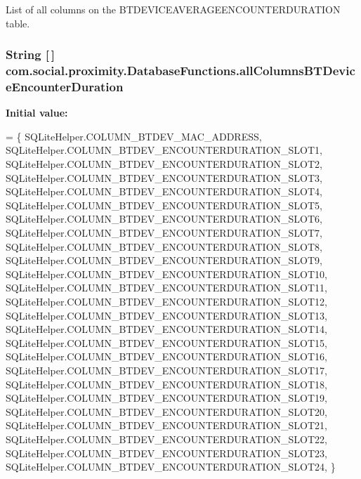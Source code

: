 List of all columns on the B\+T\+D\+E\+V\+I\+C\+E\+A\+V\+E\+R\+A\+G\+E\+E\+N\+C\+O\+U\+N\+T\+E\+R\+D\+U\+R\+A\+T\+I\+O\+N table. \hypertarget{classcom_1_1social_1_1proximity_1_1_database_functions_ab59f771fe031574737a9c5a9487d2540}{}
\subsubsection[{all\+Columns\+B\+T\+Device\+Encounter\+Duration}]{\setlength{\rightskip}{0pt plus 5cm}String \mbox{[}$\,$\mbox{]} com.\+social.\+proximity.\+Database\+Functions.\+all\+Columns\+B\+T\+Device\+Encounter\+Duration\hspace{0.3cm}{\ttfamily [private]}}\label{classcom_1_1social_1_1proximity_1_1_database_functions_ab59f771fe031574737a9c5a9487d2540}
{\bfseries Initial value\+:}
\begin{DoxyCode}
= \{ 
            SQLiteHelper.COLUMN\_BTDEV\_MAC\_ADDRESS,
            SQLiteHelper.COLUMN\_BTDEV\_ENCOUNTERDURATION\_SLOT1,
            SQLiteHelper.COLUMN\_BTDEV\_ENCOUNTERDURATION\_SLOT2,
            SQLiteHelper.COLUMN\_BTDEV\_ENCOUNTERDURATION\_SLOT3,
            SQLiteHelper.COLUMN\_BTDEV\_ENCOUNTERDURATION\_SLOT4,
            SQLiteHelper.COLUMN\_BTDEV\_ENCOUNTERDURATION\_SLOT5,
            SQLiteHelper.COLUMN\_BTDEV\_ENCOUNTERDURATION\_SLOT6,
            SQLiteHelper.COLUMN\_BTDEV\_ENCOUNTERDURATION\_SLOT7,
            SQLiteHelper.COLUMN\_BTDEV\_ENCOUNTERDURATION\_SLOT8,
            SQLiteHelper.COLUMN\_BTDEV\_ENCOUNTERDURATION\_SLOT9,
            SQLiteHelper.COLUMN\_BTDEV\_ENCOUNTERDURATION\_SLOT10,
            SQLiteHelper.COLUMN\_BTDEV\_ENCOUNTERDURATION\_SLOT11,
            SQLiteHelper.COLUMN\_BTDEV\_ENCOUNTERDURATION\_SLOT12,
            SQLiteHelper.COLUMN\_BTDEV\_ENCOUNTERDURATION\_SLOT13,
            SQLiteHelper.COLUMN\_BTDEV\_ENCOUNTERDURATION\_SLOT14,
            SQLiteHelper.COLUMN\_BTDEV\_ENCOUNTERDURATION\_SLOT15,
            SQLiteHelper.COLUMN\_BTDEV\_ENCOUNTERDURATION\_SLOT16,
            SQLiteHelper.COLUMN\_BTDEV\_ENCOUNTERDURATION\_SLOT17,
            SQLiteHelper.COLUMN\_BTDEV\_ENCOUNTERDURATION\_SLOT18,
            SQLiteHelper.COLUMN\_BTDEV\_ENCOUNTERDURATION\_SLOT19,
            SQLiteHelper.COLUMN\_BTDEV\_ENCOUNTERDURATION\_SLOT20,
            SQLiteHelper.COLUMN\_BTDEV\_ENCOUNTERDURATION\_SLOT21,
            SQLiteHelper.COLUMN\_BTDEV\_ENCOUNTERDURATION\_SLOT22,
            SQLiteHelper.COLUMN\_BTDEV\_ENCOUNTERDURATION\_SLOT23,
            SQLiteHelper.COLUMN\_BTDEV\_ENCOUNTERDURATION\_SLOT24,
    \}
\end{DoxyCode}
